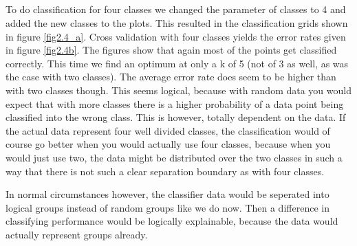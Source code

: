 \documentclass[10pt]{article}
\begin{document}
\subsection{}
To do classification for four classes we changed the parameter of classes to 4 and added the new classes to the plots. This resulted in the classification grids shown in figure \ref{fig2.4_a}. Cross validation with four classes yields the error rates given in figure \ref{fig2.4b}. The figures show that again most of the points get classified correctly. This time we find an optimum at only a k of 5 (not of 3 as well, as was the case with two classes). The average error rate does seem to be higher than with two classes though. This seems logical, because with random data you would expect that with more classes there is a higher probability of a data point being classified into the wrong class. This is however, totally dependent on the data. If the actual data represent four well divided classes, the classification would of course go better when you would actually use four classes, because when you would just use two, the data might be distributed over the two classes in such a way that there is not such a clear separation boundary as with four classes. 

In normal circumstances however, the classifier data would be seperated into logical groups instead of random groups like we do now. Then a difference in classifying performance would be logically explainable, because the data would actually represent groups already.
\end{document}
